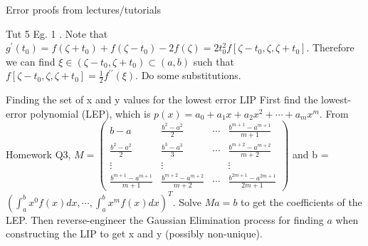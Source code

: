 \documentclass[10pt,landscape]{article}
\theoremstyle{definition}
\newcommand{\thistheoremname}{}
\newtheorem*{genericthm*}{\thistheoremname}
\newenvironment{namedthm*}[1]
{\renewcommand{\thistheoremname}{#1}\begin{genericthm*}}
{\end{genericthm*}}
\begin{document}
\begin{multicols}{3}
\begin{namedthm*}{Error proofs from lectures/tutorials}
\begin{namedthm*}{Tut 5 Eg. 1}
			\). Note that
			\(
			g^{\prime}\left(t_{0}\right)=f\left(\zeta+t_{0}\right)+f\left(\zeta-t_{0}\right)-2 f(\zeta)=2 t_{0}^{2} f\left[\zeta-t_{0}, \zeta, \zeta+t_{0}\right]
			\). Therefore we can find \(\xi \in\left(\zeta-t_{0}, \zeta+t_{0}\right) \subset(a, b)\) such that
			\(
			f\left[\zeta-t_{0}, \zeta, \zeta+t_{0}\right]=\frac{1}{2} f^{\prime \prime}(\xi)
			\). Do some substitutions.
		\end{namedthm*}
	\end{namedthm*}
	\begin{namedthm*}{Finding the set of x and y values for the lowest error LIP}
		First find the lowest-error polynomial (LEP), which is \(p(x)=a_{0}+a_{1} x+a_{2} x^{2}+\cdots+a_{m} x^{m}\). From Homework Q3, \(M=\left(\begin{array}{cccc}{b-a} & {\frac{b^{2}-a^{2}}{2}} & {\cdots} & {\frac{b^{m+1}-a^{m+1}}{m+1}} \\ {\frac{b^{2}-a^{2}}{2}} & {\frac{b^{3}-a^{3}}{3}} & {\cdots} & {\frac{b^{m+2}-a^{m+2}}{m+2}} \\ {\vdots} & {\vdots} & {} & {\vdots} \\ {\frac{b^{m+1}-a^{m+1}}{m+1}} & {\frac{b^{m+2}-a^{m+2}}{m+2}} & {\cdots} & {\frac{b^{2 m+1}-a^{2 m+1}}{2 m+1}}\end{array}\right)\) and b = \(\left(\int_{a}^{b} x^{0} f(x) d x, \cdots, \int_{a}^{b} x^{m} f(x) d x\right)^{T}\). Solve \(Ma = b\) to get the coefficients of the LEP. Then reverse-engineer the Gaussian Elimination process for finding \(a\) when constructing the LIP to get x and y (possibly non-unique).
	\end{namedthm*}

\end{multicols}
\end{document}
